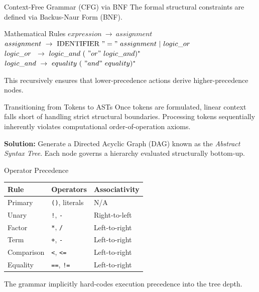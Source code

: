 \documentclass[aspectratio=169]{beamer}
\begin{document}
\begin{frame}{Context-Free Grammar (CFG) via BNF}
    The formal structural constraints are defined via Backus-Naur Form (BNF).
    \begin{alertblock}{Mathematical Rules}
        $ expression \ \rightarrow \ assignment $ \\
        $ assignment \ \rightarrow \ \text{IDENTIFIER} \ "=" \ assignment \ | \ logic\_or $ \\
        $ logic\_or \ \ \rightarrow \ logic\_and \ ( \ "or" \ logic\_and )^* $ \\
        $ logic\_and \ \rightarrow \ equality \ ( \ "and" \ equality )^* $ \\
    \end{alertblock}
    This recursively ensures that lower-precedence actions derive higher-precedence nodes.
\end{frame}

\begin{frame}{Transitioning from Tokens to ASTs}
    Once tokens are formulated, linear context falls short of handling strict structural boundaries. Processing tokens sequentially inherently violates computational order-of-operation axioms.
    
    \vspace{0.5cm}
    \textbf{Solution:} Generate a Directed Acyclic Graph (DAG) known as the \emph{Abstract Syntax Tree}. Each node governs a hierarchy evaluated structurally bottom-up.
\end{frame}

\begin{frame}{Operator Precedence}
    \begin{table}[]
        \begin{tabular}{|l|l|l|}
        \hline
        \textbf{Rule}       & \textbf{Operators}       & \textbf{Associativity}     \\ \hline
        Primary             & \texttt{()}, literals      & N/A                        \\ \hline
        Unary               & \texttt{!}, \texttt{-}     & Right-to-left              \\ \hline
        Factor              & \texttt{*}, \texttt{/}     & Left-to-right              \\ \hline
        Term                & \texttt{+}, \texttt{-}     & Left-to-right              \\ \hline
        Comparison          & \texttt{<}, \texttt{<=}    & Left-to-right              \\ \hline
        Equality            & \texttt{==}, \texttt{!=}   & Left-to-right              \\ \hline
        \end{tabular}
    \end{table}
    The grammar implicitly hard-codes execution precedence into the tree depth.
\end{frame}
\end{document}
